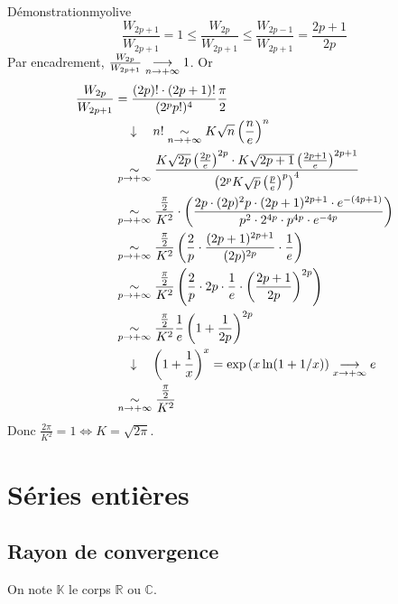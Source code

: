 \begin{demo}{Démonstration}{myolive}
            \[ \frac{W_{2p+1}}{W_{2p+1}} = 1 \leq \frac{W_{2p}}{W_{2p+1}} \leq \frac{W_{2p-1}}{W_{2p+1}} = \frac{2p+1}{2p} \] 
            Par encadrement, $\frac{W_{2p}}{W_{2p+1}} \underset{n \rightarrow +\infty}{\longrightarrow} 1$.
            Or 
            \begin{align*}
                \frac{W_{2p}}{W_{2p+1}}
                &= \frac{(2p)! \cdot (2p+1)!}{(2^p p!)^4} \frac{\pi}{2} \\
                & \quad \downarrow \quad n! \underset{n \rightarrow +\infty}{\sim} K \sqrt{n} \left( \frac{n}{e} \right)^n \\
                &\underset{p \rightarrow +\infty}{\sim} \frac{K \sqrt{2p} \left( \frac{2p}{e} \right)^{2p} \cdot K \sqrt{2p+1} \left( \frac{2p+1}{e} \right)^{2p+1}}{\left( 2^p K \sqrt{p} \left( \frac{p}{e} \right)^p \right)^4} \\
                &\underset{p \rightarrow +\infty}{\sim} \frac{\frac{\pi}{2}}{K^2} \cdot \left( \frac{2p \cdot (2p)^2p \cdot (2p+1)^{2p+1} \cdot e^{-(4p+1)}}{p^2 \cdot 2^{4p} \cdot p^{4p} \cdot e^{-4p}} \right) \\
                &\underset{p \rightarrow +\infty}{\sim} \frac{\frac{\pi}{2}}{K^2} \left( \frac{2}{p} \cdot \frac{(2p+1)^{2p+1}}{(2p)^{2p}} \cdot \frac{1}{e} \right) \\ 
                &\underset{p \rightarrow +\infty}{\sim} \frac{\frac{\pi}{2}}{K^2} \left( \frac{2}{p} \cdot 2p \cdot \frac{1}{e} \cdot \left( \frac{2p+1}{2p} \right)^{2p} \right) \\
                &\underset{p \rightarrow +\infty}{\sim} \frac{\frac{\pi}{2}}{K^2} \frac{1}{e} \left(1 + \frac{1}{2p}\right)^{2p} \\
                & \quad \downarrow \quad \left( 1 + \frac{1}{x} \right)^x = \exp\left( x \ln(1 + 1/x) \right) \underset{x \rightarrow +\infty}{\longrightarrow} e \\
                &\underset{n \rightarrow +\infty}{\sim} \frac{\frac{\pi}{2}}{K^2} 
            \end{align*}
            Donc $\frac{2\pi}{K^2} = 1 \iff K = \sqrt{2\pi}$. 
        \end{demo}

\section{Séries entières}

\subsection{Rayon de convergence}

    On note $\mathbb{K}$ le corps $\mathbb{R}$ ou $\mathbb{C}$.

